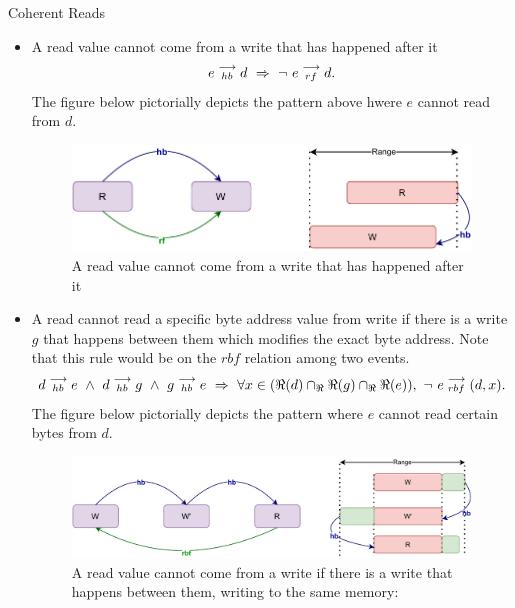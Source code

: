 \begin{axiom}{Coherent Reads}
            \begin{itemize}
                \item A read value cannot come from a write that has happened after it 
                    \begin{align*}
                        \reln{e}{hb}{d}\ \Rightarrow{}\ \neg \ \reln{e}{rf}{d}.
                    \end{align*}
                    The figure below pictorially depicts the pattern above hwere $e$ cannot read from $d$.
                    \begin{figure}[H]
                        \centering
                        \includegraphics[scale=0.7]{ECMAScriptMemoryModel/CoherentReads1.pdf}
                        \caption{A read value cannot come from a write that has happened after it}
                    \end{figure}
                \item A read cannot read a specific byte address value from write if there is a write $g$ that happens between them which modifies the exact byte address. Note that this rule would be on the $rbf$ relation among two events. 
                    \begin{align*}
                        \reln{d}{hb}{e}
                        \ \wedge \ 
                        \reln{d}{hb}{g} \ \wedge \  \reln{g}{hb}{e}
                        \ \Rightarrow{} \
                        \forall x \in (\Re(d) \cap_\Re \Re(g) \cap_\Re \Re(e)), \ \neg \ \reln{e}{rbf}{(d,x)}.
                    \end{align*}
                    The figure below pictorially depicts the pattern where $e$ cannot read certain bytes from $d$. 
                    \begin{figure}[H]
                        \centering 
                        \includegraphics[scale=0.7]{ECMAScriptMemoryModel/CoherentReads2.pdf}
                        \caption{A read value cannot come from a write if
                        there is a write that happens between them, writing to the same memory:}
                    \end{figure}
                            
            \end{itemize}
        \end{axiom}
